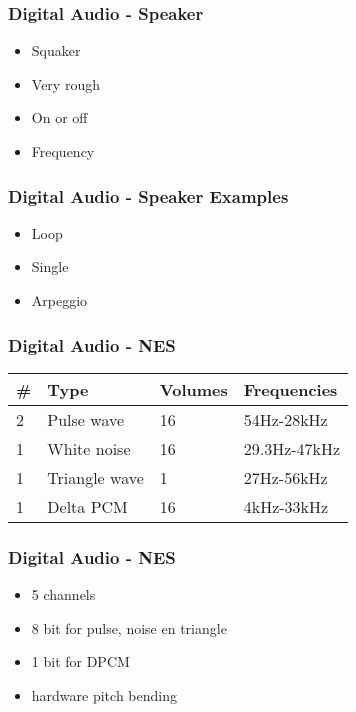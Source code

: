 
\begin{frame}
\frametitle{Digital Audio - Speaker}

\begin{itemize}
\item Squaker
\item Very rough
\item On or off
\item Frequency
\end{itemize}

\end{frame}


\begin{frame}
\frametitle{Digital Audio - Speaker Examples}

\begin{itemize}
\item Loop
\item Single
\item Arpeggio
\end{itemize}

\end{frame}


\begin{frame}
\frametitle{Digital Audio - NES}

\begin{tabular}{|l|l|l|l|}
\hline \# & Type & Volumes & Frequencies \\ \hline
2 & Pulse wave & 16 & 54Hz-28kHz \\
1 & White noise & 16 & 29.3Hz-47kHz \\
1 & Triangle wave & 1 & 27Hz-56kHz \\
1 & Delta PCM & 16 & 4kHz-33kHz \\ \hline
\end{tabular}

\end{frame}


\begin{frame}
\frametitle{Digital Audio - NES}

\begin{itemize}
\item 5 channels
\item 8 bit for pulse, noise en triangle
\item 1 bit for DPCM
\item hardware pitch bending
\end{itemize}

\end{frame}

